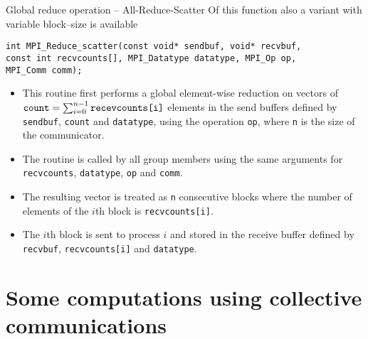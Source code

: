 \documentclass[xcolor={svgnames,usenames}]{beamer}
\begin{document}
\begin{frame}[fragile]{Global reduce operation -- All-Reduce-Scatter}
Of this function also a variant with variable block--size is available
\begin{verbatim}
int MPI_Reduce_scatter(const void* sendbuf, void* recvbuf,
const int recvcounts[], MPI_Datatype datatype, MPI_Op op,
MPI_Comm comm);
\end{verbatim}
\begin{itemize}
	\item This routine first performs a global element-wise reduction on vectors of $\verb|count|=\sum_{i=0}^{n-1}\verb|recevcounts[i]|$ elements in the send buffers defined by \texttt{sendbuf}, \texttt{count} and \texttt{datatype}, using the operation \texttt{op}, where \texttt{n} is the size of the communicator.
	\item The routine is called by all group members using the
	same arguments for \texttt{recvcounts}, \texttt{datatype}, \texttt{op} and \texttt{comm}.
	\item The resulting vector is treated as
	\texttt{n} consecutive blocks where the number of elements of the $i$th block is \texttt{recvcounts[i]}.
	\item The $i$th block is sent to process $i$ and
	stored in the receive buffer defined by \texttt{recvbuf}, \texttt{recvcounts[i]} and \texttt{datatype}.
\end{itemize}
\end{frame}

\section{Some computations using collective communications}
\end{document}
